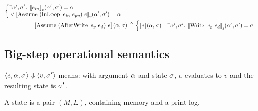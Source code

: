 \begin{align*}
\begin{cases}
\begin{aligned}
      &\exists \targ', \tmem' . \; \denotefv{e_{in}}{\targ',\tmem'} = \targ\\
      &\lor \denotefv{\bop{Assume}{(\bop{InLoop}{e_{in}}{e_{po}})}{e}}{\targ',\tmem'} = \targ
    \end{aligned}
\end{cases}\\
%
\denotef{\bop{Assume}{(\bop{AfterWrite}{e_p}{e_d})}{e}}{\targ,\tmem} &\eqdef
\begin{cases}
  \denotef{e}{\targ,\tmem} & \exists \targ', \tmem' . \; \denotefs{\bop{Write}{e_p}{e_d}}{\targ',\tmem'} = \tmem
\end{cases}\\
\end{align*}


\newpage

\subsection*{Big-step operational semantics}

$\langle e, \alpha, \sigma \rangle \Downarrow \langle v, \sigma' \rangle$ means: with argument $\alpha$ and state $\sigma$, $e$ evaluates to $v$ and the resulting state is $\sigma'$.

A state is a pair $(M, L)$, containing memory and a print log.

